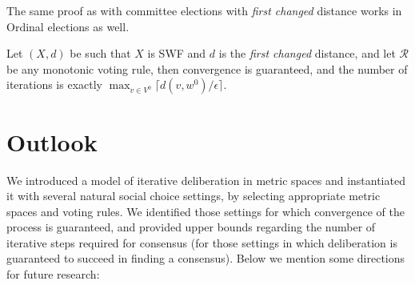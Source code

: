 \documentclass[runningheads,envcountsame]{llncs}
\begin{document}
The same proof as with committee elections with \emph{first changed} distance works in Ordinal elections as well.

\begin{corollary}\label{theorem:swf first changed}
  Let $(X, d)$ be such that $X$ is SWF and $d$ is the \emph{first changed} distance, and let $\mathcal{R}$ be any monotonic voting rule, then convergence is guaranteed, and the number of iterations is exactly $\max_{v \in V^0} \lceil d(v, w^0)/\epsilon\rceil$.
\end{corollary}

\section{Outlook}\label{section:outlook}

We introduced a model of iterative deliberation in metric spaces and instantiated it with several natural social choice settings, by selecting appropriate metric spaces and voting rules.
%
We identified those settings for which convergence of the process is guaranteed, and provided upper bounds regarding the number of iterative steps required for consensus (for those settings in which deliberation is guaranteed to succeed in finding a consensus).
%
Below we mention some directions for future research:
%
\end{document}
